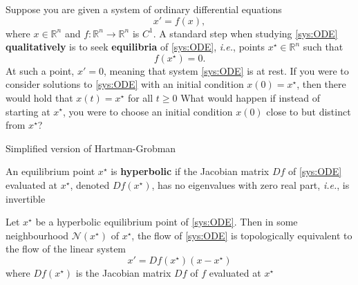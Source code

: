 \documentclass{beamer}
\def\IR{\mathbb{R}}
\def\ie{\emph{i.e.}}
\def\defword#1{\textbf{#1}}
\begin{document}
\begin{frame}
Suppose you are given a system of ordinary differential equations
\begin{equation}\label{sys:ODE}
x'=f(x),
\end{equation}
where $x\in\IR^n$ and $f:\IR^n\to\IR^n$ is $C^1$. A standard step when studying \eqref{sys:ODE} \defword{qualitatively} is to seek \defword{equilibria} of \eqref{sys:ODE}, \ie, points $x^\star\in\IR^n$ such that
\begin{equation}\label{eq:equilibrium}
f(x^\star)=0.
\end{equation}
At such a point, $x'=0$, meaning that system \eqref{sys:ODE} is at rest. If you were to consider solutions to \eqref{sys:ODE} with an initial condition $x(0)=x^\star$, then there would hold that $x(t)=x^\star$ for all $t\geq 0$
\vfill
What would happen if instead of starting at $x^\star$, you were to choose an initial condition $x(0)$ close to but distinct from $x^\star$?
\end{frame}

\begin{frame}{Simplified version of Hartman-Grobman}
\begin{definition}
An equilibrium point $x^\star$ is \textbf{hyperbolic} if the Jacobian matrix $Df$ of \eqref{sys:ODE} evaluated at $x^\star$, denoted $Df(x^\star)$, has no eigenvalues with zero real part, \ie, is invertible
\end{definition}

\begin{theorem}\label{th:HartmanGrobman}
Let $x^\star$ be a hyperbolic equilibrium point of \eqref{sys:ODE}.
Then in some neighbourhood $\mathcal{N}(x^\star)$ of $x^\star$, the flow of \eqref{sys:ODE} is topologically equivalent to the flow of the linear system 
\begin{equation}\label{sys:linearized}
x'=Df(x^\star)(x-x^\star)
\end{equation} 
where $Df(x^\star)$ is the Jacobian matrix $Df$ of $f$ evaluated at $x^\star$
\end{theorem}
\end{frame}
\end{document}
